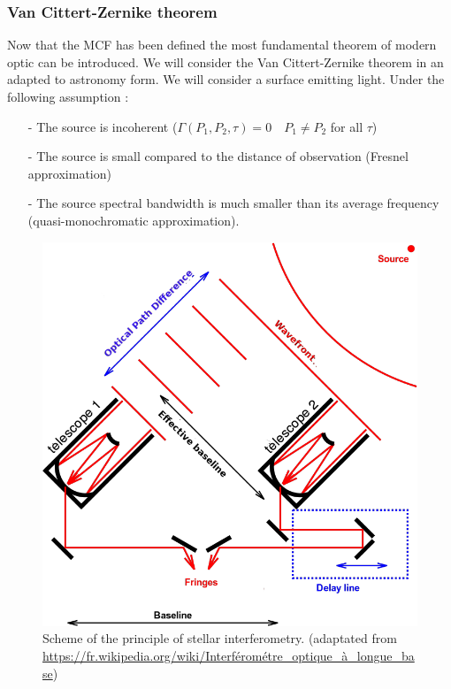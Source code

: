 	\subsubsection{Van Cittert-Zernike theorem}
Now that the MCF has been defined the most fundamental theorem of modern optic can be introduced. We will consider the Van Cittert-Zernike theorem in an adapted to astronomy form. We will consider a surface emitting light. Under the following assumption :
\begin{itemize}
\item[-]The source is incoherent ($\Gamma(P_1,P_2,\tau) = 0 \quad P_1 \neq P_2$ for all $\tau$)
\item[-]The source is small compared to the distance of observation (Fresnel approximation)
\item[-]The source spectral bandwidth is much smaller than its average frequency (quasi-monochromatic approximation).
\end{itemize}

\begin{figure}[htbp!]
\centering
\includegraphics[scale=.3]{../images/scheme.png}
\caption{Scheme of the principle of stellar interferometry. (adaptated from \url{https://fr.wikipedia.org/wiki/Interférométre_optique_à_longue_base})}
\end{figure}

